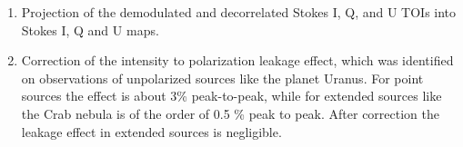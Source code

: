 \documentclass[twocolumn,traditabstract]{aa}
\begin{document}
\begin{enumerate}
\item Projection of the demodulated and decorrelated Stokes I, Q, and U TOIs into Stokes I, Q and U maps.

\item Correction of the intensity to polarization leakage effect, which was identified on observations of unpolarized sources like the planet Uranus. For point sources the effect is about 3\% peak-to-peak, while for extended sources like the Crab nebula is of the order of 0.5 \% peak to peak. After correction the leakage effect in extended sources is negligible. 
\end{enumerate}
\end{document}
